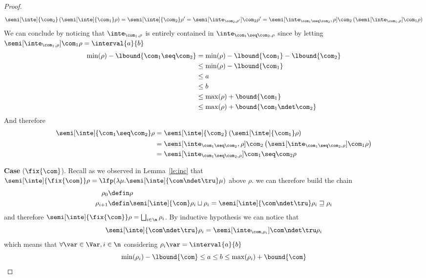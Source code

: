 \begin{proof}
\begin{equation*}
    \semi[\inte]{\com_2}\left(\semi[\inte]{\com_1}\rho\right) =
    \semi[\inte]{\com_2}\rho' = \semi[\inte_{\com_2,\rho'}]{\com_2}\rho' =
    \semi[\inte_{\com_1\seq\com_2}, \rho]{\com_2}\left(\semi[\inte_{\com_1, \rho}]{\com_1}\rho\right)
  \end{equation*}
  We can conclude by noticing that \(\inte_{\com_1,\rho}\) is entirely
  contained in \(\inte_{\com_1\seq \com_2, \rho}\) since by letting
  \({\semi[\inte_{\com_1,\rho}]{\com_1}\rho = \interval{a}{b}}\)
  \begin{align*}
    \min(\rho) - \lbound{\com_1\seq \com_2} & = \min(\rho) - \lbound{\com_1} - \lbound{\com_2} \\
                                            & \leq  \min(\rho) - \lbound{\com_1} \\
                                            & \leq a \\
                                            & \leq b \\
                                            & \leq \max(\rho) + \bound{\com_1}  \\
                                            & \leq \max(\rho) + \bound{\com_1 \ndet \com_2}
  \end{align*}
  And therefore
  \begin{align*}
     \semi[\inte]{\com_1\seq \com_2}\rho & = \semi[\inte]{\com_2}\left(\semi[\inte]{\com_1}\rho\right)\\
                                          & = \semi[\inte_{\com_1\seq\com_2}, \rho]{\com_2}\left(\semi[\inte_{\com_1\seq\com_2, \rho}]{\com_1}\rho\right) \\
                                          & = \semi[\inte_{\com_1\seq\com_2, \rho}]{\com_1\seq\com_2}\rho
  \end{align*}

  \medskip

  \noindent
  \textbf{Case} (\(\fix{\com}\)).
  Recall as we observed in Lemma~\ref{le:inc} that
  \({\semi[\inte]{\fix{\com}}\rho} = {\lfp(\lambda \mu
    . \semi[\inte]{\com \ndet \tru}\mu)}\) above \(\rho\). we can
  therefore build the chain
  \begin{align*}
    \rho_0 & \defin \rho \\
    \rho_{i+1} & \defin \semi[\inte]{\com}\rho_i \sqcup \rho_i = \semi[\inte]{\com \ndet \tru}\rho_i \sqsupseteq \rho_i
  \end{align*}
  and therefore
  \({\semi[\inte]{\fix{\com}}\rho} =
  {\textstyle\bigsqcup_{i\in\n}\rho_i}\). By inductive hypothesis we
  can notice that
  \begin{equation*}
    \semi[\inte]{\com \ndet \tru}\rho_i = \semi[\inte_{\com,\rho_i}]{\com \ndet \tru}\rho_i
  \end{equation*}
  which means that \(\forall \var\in\Var, i\in\n\) considering
  \(\rho_i\var = \interval{a}{b}\)
  \begin{equation*}
    \min(\rho_i) - \lbound{\com} \leq a \leq b \leq \max(\rho_i) + \bound{\com}
  \end{equation*}

\end{proof}

